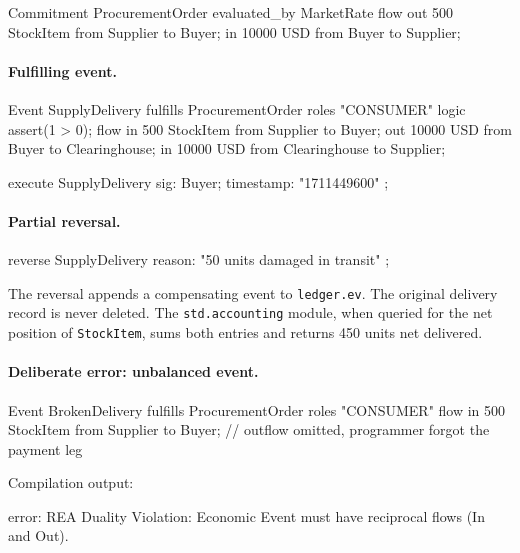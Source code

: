 \documentclass[11pt,a4paper]{article}
\theoremstyle{remark}
\begin{document}
\begin{equiscode}
Commitment ProcurementOrder evaluated_by MarketRate {
    flow {
        out 500 StockItem from Supplier to Buyer;
        in  10000 USD from Buyer to Supplier;
    }
}
\end{equiscode}

\paragraph{Fulfilling event.}

\begin{equiscode}
Event SupplyDelivery fulfills ProcurementOrder roles { "CONSUMER" } {
    logic {
        assert(1 > 0);
    }
    flow {
        in  500 StockItem from Supplier to Buyer;
        out 10000 USD from Buyer to Clearinghouse;
        in  10000 USD from Clearinghouse to Supplier;
    }
}

execute SupplyDelivery { sig: Buyer; timestamp: "1711449600" };
\end{equiscode}

\paragraph{Partial reversal.}

\begin{equiscode}
reverse SupplyDelivery { reason: "50 units damaged in transit" };
\end{equiscode}

The reversal appends a compensating event to \texttt{ledger.ev}. The
original delivery record is never deleted. The \texttt{std.accounting}
module, when queried for the net position of \texttt{StockItem}, sums
both entries and returns 450 units net delivered.

\paragraph{Deliberate error: unbalanced event.}

\begin{equiscode}
Event BrokenDelivery fulfills ProcurementOrder roles { "CONSUMER" } {
    flow {
        in  500 StockItem from Supplier to Buyer;
        // outflow omitted, programmer forgot the payment leg
    }
}
\end{equiscode}

Compilation output:

\begin{plaincode}
error: REA Duality Violation: Economic Event must have reciprocal
       flows (In and Out).
\end{plaincode}
\end{document}
